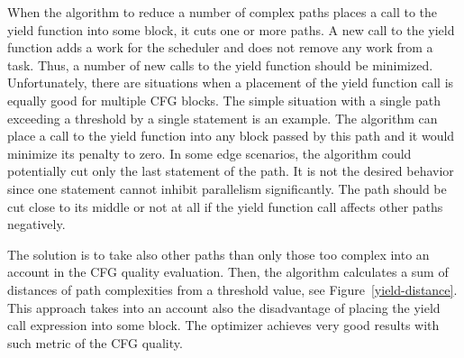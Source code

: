 When the algorithm to reduce a number of complex paths places a call to the yield function into some block, it cuts one or more paths. A new call to the yield function adds a work for the scheduler and does not remove any work from a task. Thus, a number of new calls to the yield function should be minimized. Unfortunately, there are situations when a placement of the yield function call is equally good for multiple CFG blocks. The simple situation with a single path exceeding a threshold by a single statement is an example. The algorithm can place a call to the yield function into any block passed by this path and it would minimize its penalty to zero. In some edge scenarios, the algorithm could potentially cut only the last statement of the path. It is not the desired behavior since one statement cannot inhibit parallelism significantly. The path should be cut close to its middle or not at all if the yield function call affects other paths negatively.

The solution is to take also other paths than only those too complex into an account in the CFG quality evaluation. Then, the algorithm calculates a sum of distances of path complexities from a threshold value, see Figure~\ref{yield-distance}. This approach takes into an account also the disadvantage of placing the yield call expression into some block. The optimizer achieves very good results with such metric of the CFG quality.

